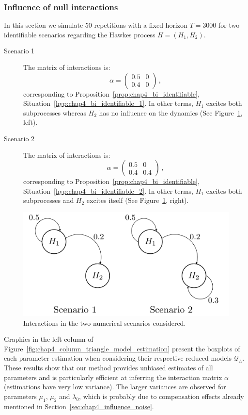		
		\subsubsection{Influence of null interactions}
		\label{sec:chap4_bi_two_scenarios}

        In this section we simulate $50$ repetitions with a fixed horizon $T=3000$ for two identifiable scenarios regarding the Hawkes process $H = (H_1, H_2)$.
        \begin{description}
          \item[Scenario 1] The matrix of interactions is:
          \[
            \alpha = \begin{pmatrix} 0.5 & 0 \\ 0.4 & 0 \end{pmatrix}\,,
          \]
          corresponding to Proposition~\ref{prop:chap4_bi_identifiable}, Situation~\ref{hyp:chap4_bi_identifiable_1}.
          In other terms, $H_1$ excites both subprocesses whereas $H_2$ has no influence on the dynamics (See Figure~\ref{fig:chap4_bi_scenario}, left).
          \item[Scenario 2] The matrix of interactions is:
          \[
            \alpha = \begin{pmatrix} 0.5 & 0 \\ 0.4 & 0.4 \end{pmatrix}\,,
          \]
          corresponding to Proposition~\ref{prop:chap4_bi_identifiable}, Situation~\ref{hyp:chap4_bi_identifiable_2}.
          In other terms, $H_1$ excites both subprocesses and $H_2$ excites itself (See Figure~\ref{fig:chap4_bi_scenario}, right).
        \end{description}
        		
        \begin{figure}[!ht]
  			\centering
			  \includegraphics[width=0.5\linewidth]{images/chapter4//bivariate_spectral_hawkes.pdf}
 		   	\caption{
 		   	Interactions in the two numerical scenarios considered.
 		   	}
 		  	\label{fig:chap4_bi_scenario}
	   	\end{figure}

      Graphics in the left column of Figure~\ref{fig:chap4_column_triangle_model_estimation} present the boxplots of each parameter estimation when considering their respective reduced models $\mathcal{Q}_{\Lambda}$.		
      These results show that our method provides unbiased estimates of all parameters and is particularly efficient at inferring the interaction matrix $\alpha$ (estimations have very low variance).
      The larger variances are observed for parameters $\mu_1$, $\mu_2$ and $\lambda_0$, which is probably due to compensation effects already mentioned in Section~\ref{sec:chap4_influence_noise}.

